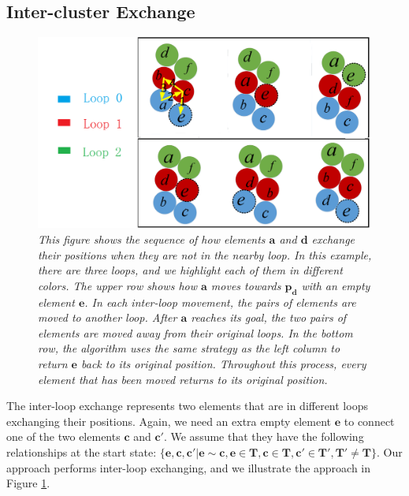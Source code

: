 \subsection{Inter-cluster Exchange}
\begin{figure}[!ht]
\centering
\includegraphics[width=0.6\linewidth]{figs/InterMovement}
\caption{\em This figure shows the sequence of how elements $\mathbf{a}$ and  $\mathbf{d}$ exchange their positions when they are not in the nearby loop. In this example, there are three loops, and we highlight each of them in different colors.
The upper row shows how $\mathbf{a}$ moves towards $\mathbf{p_d}$ with an empty element  $\mathbf{e}$. In each inter-loop movement, the pairs of elements are moved to another loop. After $\mathbf{a}$ reaches its goal, the two pairs of elements are moved away from their original loops. In the bottom row, the algorithm uses the same strategy as the left column to return $\mathbf{e}$ back to its original position. Throughout this process, every element that has been moved returns to its original position.}
\label{fig:inter}
\end{figure}


The inter-loop exchange represents two elements that are in different loops exchanging their positions. Again, we need an extra empty element $\mathbf{e}$ to connect one of the two elements $\mathbf{c}$ and $\mathbf{c'}$. 
We assume that they have the following relationships at the start state:
$ \{\mathbf{e}, \mathbf{c},\mathbf{c'} | \mathbf{e} \sim \mathbf{c}, \mathbf{e} \in \mathbf{T}, \mathbf{c} \in \mathbf{T}, \mathbf{c'} \in \mathbf{T'}, \mathbf{T'} \neq \mathbf{T} \}$. 
Our approach performs inter-loop exchanging, and we illustrate the approach in Figure \ref{fig:inter}.



